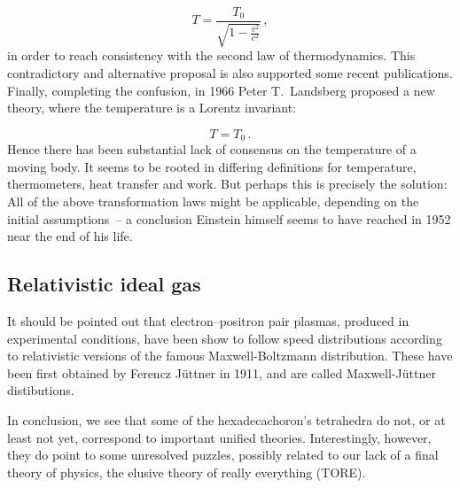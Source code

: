 \begin{equation*}\label{reltemphigher}
  T = \frac{T_0}{\sqrt{1-\frac{v^2}{c^2}}}\,,
\end{equation*}
%
in order to reach consistency with the second law of thermodynamics. This contradictory and alternative proposal is also supported some recent publications. Finally, completing the confusion, in 1966 Peter T.\ Landsberg proposed a new theory, where the temperature is a Lorentz invariant:

\begin{equation*}\label{reltempequal}
  T = T_0\,.
\end{equation*}
%
Hence there has been substantial lack of consensus on the temperature of a moving body. It seems to be rooted in differing definitions for temperature, thermometers, heat transfer and work. But perhaps this is precisely the solution: All of the above transformation laws might be applicable, depending on the initial assumptions~-- a conclusion Einstein himself seems to have reached in 1952 near the end of his life.


\subsection*{Relativistic ideal gas}

It should be pointed out that electron–positron pair plasmas, produced in experimental conditions, have been show to follow speed distributions according to relativistic versions of the famous Maxwell-Boltzmann distribution. These have been first obtained by Ferencz Jüttner in 1911, and are called Maxwell-Jüttner distibutions.

In conclusion, we see that some of the hexadecachoron's tetrahedra do not, or at least not yet, correspond to important unified theories. Interestingly, however, they do point to some unresolved puzzles, possibly related to our lack of a final theory of physics, the elusive theory of really everything (TORE).
